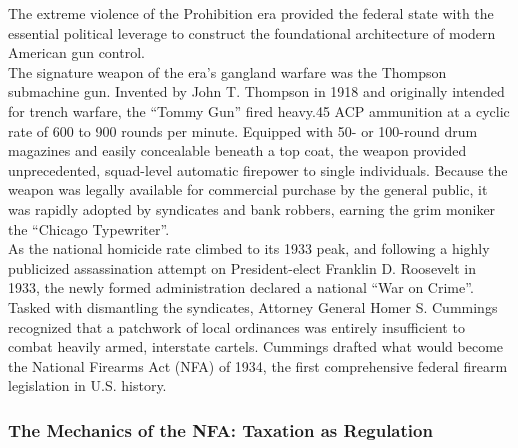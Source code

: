 \documentclass[
]{article}
\begin{document}
The extreme violence of the Prohibition era provided the federal state
with the essential political leverage to construct the foundational
architecture of modern American gun control.\\
The signature weapon of the era's gangland warfare was the Thompson
submachine gun. Invented by John T. Thompson in 1918 and originally
intended for trench warfare, the ``Tommy Gun'' fired heavy.45 ACP
ammunition at a cyclic rate of 600 to 900 rounds per minute. Equipped
with 50- or 100-round drum magazines and easily concealable beneath a
top coat, the weapon provided unprecedented, squad-level automatic
firepower to single individuals. Because the weapon was legally
available for commercial purchase by the general public, it was rapidly
adopted by syndicates and bank robbers, earning the grim moniker the
``Chicago Typewriter''.\\
As the national homicide rate climbed to its 1933 peak, and following a
highly publicized assassination attempt on President-elect Franklin D.
Roosevelt in 1933, the newly formed administration declared a national
``War on Crime''. Tasked with dismantling the syndicates, Attorney
General Homer S. Cummings recognized that a patchwork of local
ordinances was entirely insufficient to combat heavily armed, interstate
cartels. Cummings drafted what would become the National Firearms Act
(NFA) of 1934, the first comprehensive federal firearm legislation in
U.S. history.

\subsubsection{\texorpdfstring{\textbf{The Mechanics of the NFA:
Taxation as
Regulation}}{The Mechanics of the NFA: Taxation as Regulation}}\label{the-mechanics-of-the-nfa-taxation-as-regulation}
\end{document}

